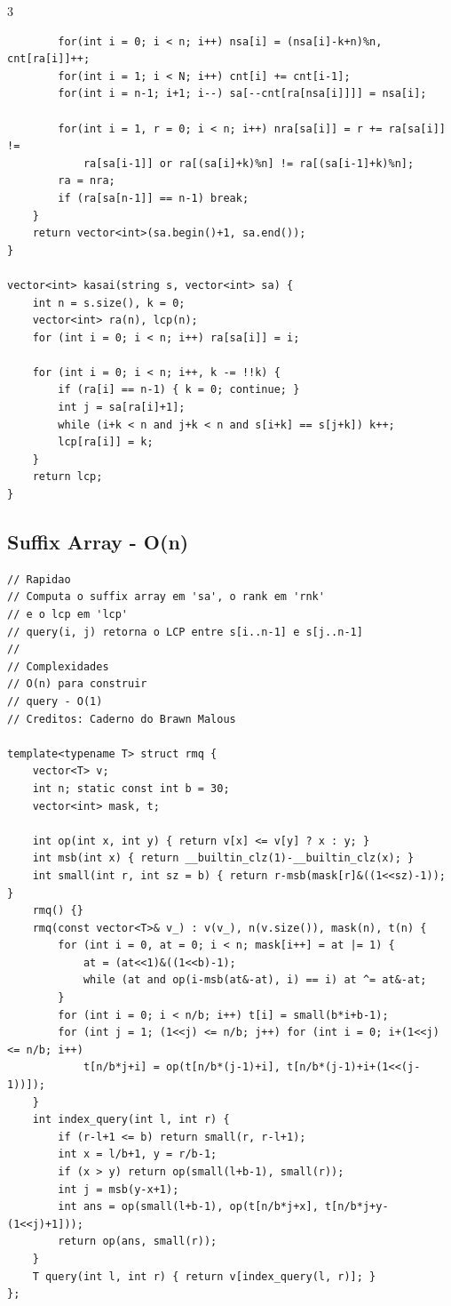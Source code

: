 \documentclass[9pt, a4paper, notitlepage]{extreport}
\begin{document}
\begin{multicols}{3}
\begin{verbatim}
		for(int i = 0; i < n; i++) nsa[i] = (nsa[i]-k+n)%n, cnt[ra[i]]++;
		for(int i = 1; i < N; i++) cnt[i] += cnt[i-1];
		for(int i = n-1; i+1; i--) sa[--cnt[ra[nsa[i]]]] = nsa[i];

		for(int i = 1, r = 0; i < n; i++) nra[sa[i]] = r += ra[sa[i]] !=
			ra[sa[i-1]] or ra[(sa[i]+k)%n] != ra[(sa[i-1]+k)%n];
		ra = nra;
		if (ra[sa[n-1]] == n-1) break;
	}
	return vector<int>(sa.begin()+1, sa.end());
}

vector<int> kasai(string s, vector<int> sa) {
	int n = s.size(), k = 0;
	vector<int> ra(n), lcp(n);
	for (int i = 0; i < n; i++) ra[sa[i]] = i;

	for (int i = 0; i < n; i++, k -= !!k) {
		if (ra[i] == n-1) { k = 0; continue; }
		int j = sa[ra[i]+1];
		while (i+k < n and j+k < n and s[i+k] == s[j+k]) k++;
		lcp[ra[i]] = k;
	}
	return lcp;
}
\end{verbatim}

\subsection{Suffix Array - O(n)}
\begin{verbatim}
// Rapidao
// Computa o suffix array em 'sa', o rank em 'rnk'
// e o lcp em 'lcp'
// query(i, j) retorna o LCP entre s[i..n-1] e s[j..n-1]
//
// Complexidades
// O(n) para construir
// query - O(1)
// Creditos: Caderno do Brawn Malous

template<typename T> struct rmq {
	vector<T> v;
	int n; static const int b = 30;
	vector<int> mask, t;

	int op(int x, int y) { return v[x] <= v[y] ? x : y; }
	int msb(int x) { return __builtin_clz(1)-__builtin_clz(x); }
	int small(int r, int sz = b) { return r-msb(mask[r]&((1<<sz)-1)); }
	rmq() {}
	rmq(const vector<T>& v_) : v(v_), n(v.size()), mask(n), t(n) {
		for (int i = 0, at = 0; i < n; mask[i++] = at |= 1) {
			at = (at<<1)&((1<<b)-1);
			while (at and op(i-msb(at&-at), i) == i) at ^= at&-at;
		}
		for (int i = 0; i < n/b; i++) t[i] = small(b*i+b-1);
		for (int j = 1; (1<<j) <= n/b; j++) for (int i = 0; i+(1<<j) <= n/b; i++)
			t[n/b*j+i] = op(t[n/b*(j-1)+i], t[n/b*(j-1)+i+(1<<(j-1))]);
	}
	int index_query(int l, int r) {
		if (r-l+1 <= b) return small(r, r-l+1);
		int x = l/b+1, y = r/b-1;
		if (x > y) return op(small(l+b-1), small(r));
		int j = msb(y-x+1);
		int ans = op(small(l+b-1), op(t[n/b*j+x], t[n/b*j+y-(1<<j)+1]));
		return op(ans, small(r));
	}
	T query(int l, int r) { return v[index_query(l, r)]; }
};


\end{verbatim}
\end{multicols}
\end{document}
